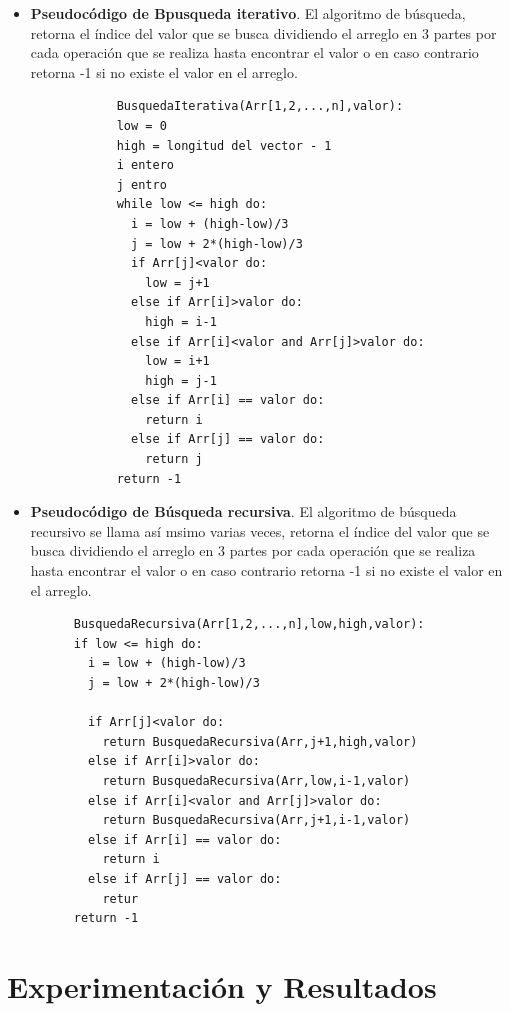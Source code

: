 \documentclass[12pt,twoside]{article}
\begin{document}
\begin{itemize}
\item \textbf{Pseudocódigo de Bpusqueda iterativo}.
El algoritmo de búsqueda, retorna el índice del valor que se busca dividiendo el arreglo en 3 partes por cada operación
que se realiza hasta encontrar el valor o en caso contrario retorna -1 si no existe el valor en el arreglo.
\begin{center}
\begin{verbatim}
            BusquedaIterativa(Arr[1,2,...,n],valor):
            low = 0
            high = longitud del vector - 1
            i entero 
            j entro
            while low <= high do:
              i = low + (high-low)/3
              j = low + 2*(high-low)/3
              if Arr[j]<valor do:
                low = j+1
              else if Arr[i]>valor do:
                high = i-1
              else if Arr[i]<valor and Arr[j]>valor do:
                low = i+1
                high = j-1
              else if Arr[i] == valor do:
                return i
              else if Arr[j] == valor do:
                return j
            return -1
\end{verbatim}
\end{center}
\item \textbf{Pseudocódigo de Búsqueda recursiva}.
El algoritmo de búsqueda recursivo se llama así msimo varias veces, retorna el índice del valor que se busca dividiendo el arreglo en 3 partes por cada operación
que se realiza hasta encontrar el valor o en caso contrario retorna -1 si no existe el valor en el arreglo.
\begin{center}
\begin{verbatim}
      BusquedaRecursiva(Arr[1,2,...,n],low,high,valor):
      if low <= high do:
        i = low + (high-low)/3
        j = low + 2*(high-low)/3
         
        if Arr[j]<valor do:
          return BusquedaRecursiva(Arr,j+1,high,valor)
        else if Arr[i]>valor do:
          return BusquedaRecursiva(Arr,low,i-1,valor)
        else if Arr[i]<valor and Arr[j]>valor do:
          return BusquedaRecursiva(Arr,j+1,i-1,valor)
        else if Arr[i] == valor do:
          return i
        else if Arr[j] == valor do:
          retur
      return -1
\end{verbatim}
\end{center}

\end{itemize}
\newpage
\section{Experimentación y Resultados}
\end{document}
